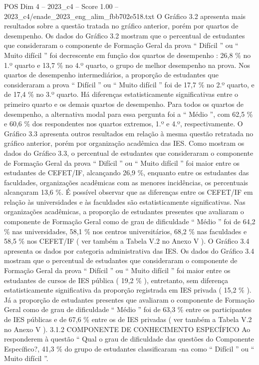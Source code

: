 \begin{textsample}{POS Dim 4 – 2023\_c4 – Score 1.00 – 2023\_c4/enade\_2023\_eng\_alim\_fbb702e518.txt}
O Gráfico 3.2 apresenta mais resultados sobre a questão tratada no gráfico anterior, porém por quartos de desempenho.
Os dados do Gráfico 3.2 mostram que o percentual de estudantes que consideraram o componente de Formação Geral da prova “ Difícil ” ou “ Muito difícil ” foi decrescente em função dos quartos de desempenho : 26,8 \% no 1.º quarto e 13,7 \% no 4.º quarto, o grupo de melhor desempenho na prova.
Nos quartos de desempenho intermediários, a proporção de estudantes que consideraram a prova “ Difícil ” ou “ Muito difícil ” foi de 17,7 \% no 2.º quarto, e de 17,4 \% no 3.º quarto.
Há diferenças estatisticamente significativas entre o primeiro quarto e os demais quartos de desempenho.
Para todos os quartos de desempenho, a alternativa modal para essa pergunta foi a “ Médio ”, com 62,5 \% e 60,6 \% dos respondentes nos quartos extremos, 1.º e 4.º, respectivamente.
O Gráfico 3.3 apresenta outros resultados em relação à mesma questão retratada no gráfico anterior, porém por organização acadêmica das IES.
Como mostram os dados do Gráfico 3.3, o percentual de estudantes que consideraram o componente de Formação Geral da prova “ Difícil ” ou “ Muito difícil ” foi maior entre os estudantes de CEFET/IF, alcançando 26,9 \%, enquanto entre os estudantes das faculdades, organizações acadêmicas com as menores incidências, os percentuais alcançaram 13,6 \%.
É possível observar que as diferenças entre os CEFET/IF em relação às universidades e às faculdades são estatisticamente significativas.
Nas organizações acadêmicas, a proporção de estudantes presentes que avaliaram o componente de Formação Geral como de grau de dificuldade “ Médio ” foi de 64,2 \% nas universidades, 58,1 \% nos centros universitários, 68,2 \% nas faculdades e 58,5 \% nos CEFET/IF ( ver também a Tabela V.2 no Anexo V ).
O Gráfico 3.4 apresenta os dados por categoria administrativa das IES.
Os dados do Gráfico 3.4 mostram que o percentual de estudantes que consideraram o componente de Formação Geral da prova “ Difícil ” ou “ Muito difícil ” foi maior entre os estudantes de cursos de IES pública ( 19,2 \% ), entretanto, sem diferença estatisticamente significativa da proporção registrada em IES privada ( 15,2 \% ).
Já a proporção de estudantes presentes que avaliaram o componente de Formação Geral como de grau de dificuldade “ Médio ” foi de 63,3 \% entre os participantes de IES públicas e de 67,6 \% entre os de IES privadas ( ver também a Tabela V.2 no Anexo V ). 3.1.2 COMPONENTE DE CONHECIMENTO ESPECÍFICO Ao responderem à questão “ Qual o grau de dificuldade das questões do Componente Específico?, 41,3 \% do grupo de estudantes classificaram -na como “ Difícil ” ou “ Muito difícil ”.

\end{textsample}
